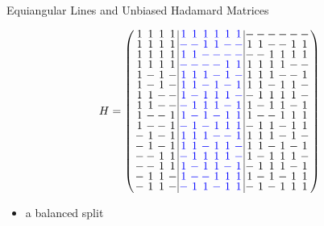\documentclass{beamer}
\newcommand{\bblue}[1]{\textcolor{blue}{#1}}
\begin{document}
\begin{frame}{Equiangular Lines and Unbiased Hadamard Matrices}

   \[
     H=
    \arraycolsep=1.0pt\def\arraystretch{0.75}
    \left(\begin{array}{cccc|cccccc|cccccc}
            1&1&1&1&\bblue{1}&\bblue{1}&\bblue{1}&\bblue{1}&\bblue{1}&\bblue{1}&-&-&-&-&-&-\\
            1&1&1&1&\bblue{-}&\bblue{-}&\bblue{1}&\bblue{1}&\bblue{-}&\bblue{-}&1&1&-&-&1&1\\
            1&1&1&1&\bblue{1}&\bblue{1}&\bblue{-}&\bblue{-}&\bblue{-}&\bblue{-}&-&-&1&1&1&1\\
            1&1&1&1&\bblue{-}&\bblue{-}&\bblue{-}&\bblue{-}&\bblue{1}&\bblue{1}&1&1&1&1&-&-\\
            1&-&1&-&\bblue{1}&\bblue{1}&\bblue{1}&\bblue{-}&\bblue{1}&\bblue{-}&1&1&1&-&-&1\\
            1&-&1&-&\bblue{1}&\bblue{1}&\bblue{-}&\bblue{1}&\bblue{-}&\bblue{1}&1&1&-&1&1&-\\
            1&1&-&-&\bblue{1}&\bblue{-}&\bblue{1}&\bblue{1}&\bblue{1}&\bblue{-}&-&1&1&1&1&-\\
            1&1&-&-&\bblue{-}&\bblue{1}&\bblue{1}&\bblue{1}&\bblue{-}&\bblue{1}&1&-&1&1&-&1\\
            1&-&-&1&\bblue{1}&\bblue{-}&\bblue{1}&\bblue{-}&\bblue{1}&\bblue{1}&1&-&-&1&1&1\\
            1&-&-&1&\bblue{-}&\bblue{1}&\bblue{-}&\bblue{1}&\bblue{1}&\bblue{1}&-&1&1&-&1&1\\
            -&1&-&1&\bblue{1}&\bblue{1}&\bblue{1}&\bblue{-}&\bblue{-}&\bblue{1}&1&1&1&-&1&-\\
            -&1&-&1&\bblue{1}&\bblue{1}&\bblue{-}&\bblue{1}&\bblue{1}&\bblue{-}&1&1&-&1&-&1\\
            -&-&1&1&\bblue{-}&\bblue{1}&\bblue{1}&\bblue{1}&\bblue{1}&\bblue{-}&1&-&1&1&1&-\\
            -&-&1&1&\bblue{1}&\bblue{-}&\bblue{1}&\bblue{1}&\bblue{-}&\bblue{1}&-&1&1&1&-&1\\
            -&1&1&-&\bblue{1}&\bblue{-}&\bblue{-}&\bblue{1}&\bblue{1}&\bblue{1}&1&-&1&-&1&1\\
            -&1&1&-&\bblue{-}&\bblue{1}&\bblue{1}&\bblue{-}&\bblue{1}&\bblue{1}&-&1&-&1&1&1\\
          \end{array}\right)
      \]

      \begin{itemize}
      \item a balanced split
      \end{itemize}
 
\end{frame}
\end{document}
